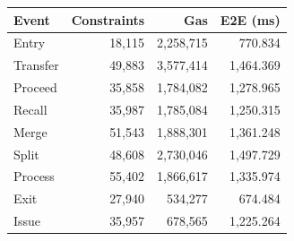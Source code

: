 \begin{center}\small\begin{tabular}{@{}lrrr@{}}\toprule
        \textbf{Event} & \textbf{Constraints} & \textbf{Gas} & \textbf{E2E (ms)} \\
        \midrule
        Entry          & 18,115               & 2,258,715    & 770.834           \\
        Transfer       & 49,883               & 3,577,414    & 1,464.369         \\
        Proceed        & 35,858               & 1,784,082    & 1,278.965         \\
        Recall         & 35,987               & 1,785,084    & 1,250.315         \\
        Merge          & 51,543               & 1,888,301    & 1,361.248         \\
        Split          & 48,608               & 2,730,046    & 1,497.729         \\
        Process        & 55,402               & 1,866,617    & 1,335.974         \\
        Exit           & 27,940               & 534,277      & 674.484           \\
        Issue          & 35,957               & 678,565      & 1,225.264         \\
        \bottomrule\end{tabular}\end{center}
